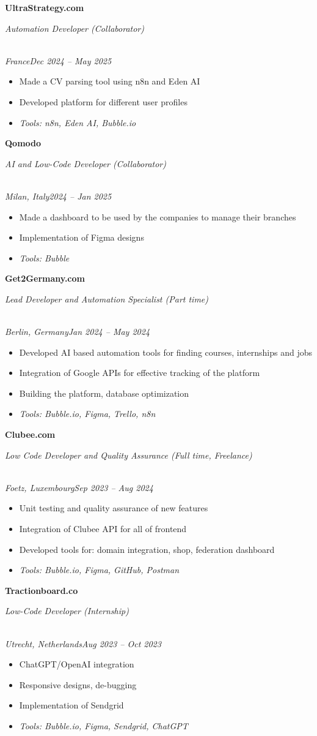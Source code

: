 \documentclass[a4paper,10pt]{article}
\newcommand{\role}[4]{\vspace{3pt}\noindent\hspace{0.6em}\parbox[t]{0.38\textwidth}{\raggedright\textbf{#1}}\hfill\parbox[t]{0.58\textwidth}{\raggedleft\textit{#2}}\\{\textit{#3}\hfill\textit{#4}}\vspace{1pt}}
\begin{document}
\role{UltraStrategy.com}{Automation Developer (Collaborator)}{France}{Dec 2024 -- May 2025}
\begin{itemize}
\item Made a CV parsing tool using n8n and Eden AI
\item Developed platform for different user profiles
\item \textit{Tools: n8n, Eden AI, Bubble.io}
\end{itemize}

\role{Qomodo}{AI and Low-Code Developer (Collaborator)}{Milan, Italy}{2024 -- Jan 2025}
\begin{itemize}
\item Made a dashboard to be used by the companies to manage their branches
\item Implementation of Figma designs
\item \textit{Tools: Bubble}
\end{itemize}

\role{Get2Germany.com}{Lead Developer and Automation Specialist (Part time)}{Berlin, Germany}{Jan 2024 -- May 2024}
\begin{itemize}
\item Developed AI based automation tools for finding courses, internships and jobs
\item Integration of Google APIs for effective tracking of the platform
\item Building the platform, database optimization
\item \textit{Tools: Bubble.io, Figma, Trello, n8n}
\end{itemize}

\role{Clubee.com}{Low Code Developer and Quality Assurance (Full time, Freelance)}{Foetz, Luxembourg}{Sep 2023 -- Aug 2024}
\begin{itemize}
\item Unit testing and quality assurance of new features
\item Integration of Clubee API for all of frontend
\item Developed tools for: domain integration, shop, federation dashboard
\item \textit{Tools: Bubble.io, Figma, GitHub, Postman}
\end{itemize}

\role{Tractionboard.co}{Low-Code Developer (Internship)}{Utrecht, Netherlands}{Aug 2023 -- Oct 2023}
\begin{itemize}
\item ChatGPT/OpenAI integration
\item Responsive designs, de-bugging
\item Implementation of Sendgrid
\item \textit{Tools: Bubble.io, Figma, Sendgrid, ChatGPT}
\end{itemize}
\end{document}

